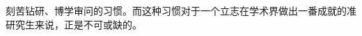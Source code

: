 刻苦钻研、博学审问的习惯。而这种习惯对于一个立志在学术界做出一番成就的准研究生来说，正是不可或缺的。




























































